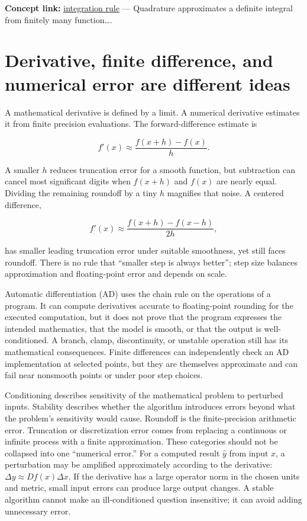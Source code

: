 \textbf{Concept link:} \hyperref[02-foundations-ii-ch022-integration-and-quadrature]{integration rule} --- Quadrature approximates a definite integral from finitely many function\ldots.

\section{Derivative, finite difference, and numerical error are different ideas}\label{02-foundations-ii-ch022-derivative-finite-difference-and-numerical-error-are-different-ideas}

\hypertarget{02-foundations-ii-ch022-derivative-finite-difference-and-numerical-error-are-different-ideas}{}

A mathematical derivative is defined by a limit. A numerical derivative estimates it from finite precision evaluations. The forward-difference estimate is

\[
f'(x)\approx\frac{f(x+h)-f(x)}{h}.
\]

A smaller \(h\) reduces truncation error for a smooth function, but subtraction can cancel most significant digits when \(f(x+h)\) and \(f(x)\) are nearly equal. Dividing the remaining roundoff by a tiny \(h\) magnifies that noise. A centered difference,

\[
f'(x)\approx\frac{f(x+h)-f(x-h)}{2h},
\]

has smaller leading truncation error under suitable smoothness, yet still faces roundoff. There is no rule that ``smaller step is always better''; step size balances approximation and floating-point error and depends on scale.

Automatic differentiation (AD) uses the chain rule on the operations of a program. It can compute derivatives accurate to floating-point rounding for the executed computation, but it does not prove that the program expresses the intended mathematics, that the model is smooth, or that the output is well-conditioned. A branch, clamp, discontinuity, or unstable operation still has its mathematical consequences. Finite differences can independently check an AD implementation at selected points, but they are themselves approximate and can fail near nonsmooth points or under poor step choices.

Conditioning describes sensitivity of the mathematical problem to perturbed inputs. Stability describes whether the algorithm introduces errors beyond what the problem's sensitivity would cause. Roundoff is the finite-precision arithmetic error. Truncation or discretization error comes from replacing a continuous or infinite process with a finite approximation. These categories should not be collapsed into one ``numerical error.'' For a computed result \(\hat y\) from input \(x\), a perturbation may be amplified approximately according to the derivative: \(\Delta y\approx Df(x)\Delta x\). If the derivative has a large operator norm in the chosen units and metric, small input errors can produce large output changes. A stable algorithm cannot make an ill-conditioned question insensitive; it can avoid adding unnecessary error.

